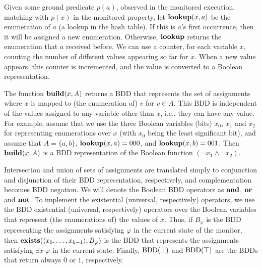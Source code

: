 Given some ground predicate $p ( a )$, observed in the monitored execution, 
matching with $p ( x )$ in the monitored property,
let $\mathbf{lookup} ( x, a )$ be the enumeration of $a$ (a lookup in the hash table). If this
is $a$'s first occurrence, then it will be assigned a new enumeration.
Otherwise, $\mathbf{lookup}$ returns the enumeration that $a$ received before. We can use a counter, for each variable $x$, counting the number of different values appearing so far for $x$. When a new value appears, this counter is incremented, and the value is converted to
a Boolean representation. 


The function $\mathbf{build} (x, A)$ returns
a BDD that represents the set of assignments where $x$ is mapped to 
(the enumeration of) $v$ for
$v \in A$. This BDD is independent
of the values assigned to any variable
other than $x$, i.e., they can have any value.
For example, assume that we use the three Boolean variables (bits) $x_0$, $x_1$ and $x_2$
for representing enumerations over $x$ (with $x_0$ being the least significant bit), and
assume that $A = \{ a , b \}$, 
$\mathbf{lookup} ( x, a ) = 000$, and $\mathbf{lookup} ( x , b ) = 001$.
Then $\mathbf{build} ( x , A )$ is a BDD representation of the Boolean function 
$(\neg x_1 \wedge \neg x_2)$. 

Intersection and union of sets of assignments are translated simply
to conjunction and disjunction of their BDD representation,
respectively, and complementation
becomes BDD negation. We will denote
the Boolean BDD operators as $\mathbf{and}$, $\mathbf{or}$ and $\mathbf{not}$.
To implement the existential (universal, respectively) operators, 
we use the BDD existential (universal, respectively) operators over
the Boolean variables that represent (the enumerations of) the values of $x$. 
Thus, if $B_{\varphi}$ is the BDD representing
the assignments satisfying $\varphi$ in
the current state of the monitor, then 
$\mathbf{exists} (\langle x_0,\ldots,x_{k-1} \rangle, B_{\varphi})$
is the BDD that represents the assignments satisfying $\exists x \; \varphi$ in the current
state.
Finally, $\mathrm{BDD}(\bot)$ and $\mathrm{BDD}(\top)$  are the BDDs that return always
$0$ or $1$, respectively.

